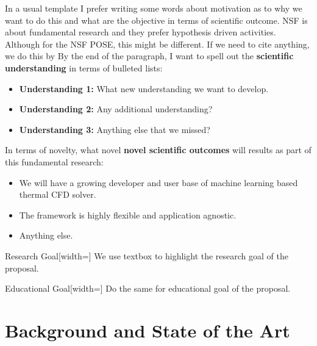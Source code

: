 \documentclass[11pt]{article}
\begin{document}
In a usual template I prefer writing some words about motivation as to why we want to do this and what are the objective in terms of scientific outcome. NSF is about fundamental research and they prefer hypothesis driven activities. Although for the NSF POSE, this might be different. If we need to cite anything, we do this by \cite{aminPhysicsGuidedHeat2024} By the end of the paragraph, I want to spell out the \textbf{scientific understanding} in terms of bulleted lists:


\vspace{-10pt}
\begin{itemize}[label=\textbullet, align=left, labelwidth=4em, labelsep=1em, leftmargin=*,noitemsep]
    \item \textbf{Understanding 1:} What new understanding we want to develop.
    \item \textbf{Understanding 2:} Any additional understanding?
    \item \textbf{Understanding 3:} Anything else that we missed?
\end{itemize}

\vspace{-10pt}
In terms of novelty, what novel \textbf{novel scientific outcomes} will results as part of this fundamental research:

\vspace{-10pt}
\begin{itemize}[label=\textbullet, align=left, labelwidth=4em, labelsep=1em, leftmargin=*,noitemsep]
    \item We will have a growing developer and user base of machine learning based thermal CFD solver.
    \item The framework is highly flexible and application agnostic.
    \item Anything else.
\end{itemize}


\begin{dashtcb}[FlyersBlue]{Research Goal}[width=\linewidth]
We use textbox to highlight the research goal of the proposal.
\end{dashtcb}

\begin{dashtcb}[FlyersRed]{Educational Goal}[width=\linewidth]
	Do the same for educational goal of the proposal.
\end{dashtcb}

\section{Background and State of the Art}
\label{sec:background}
\end{document}
